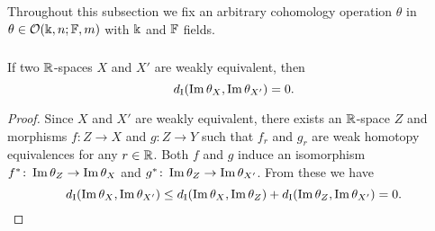 Throughout this subsection we fix an arbitrary cohomology operation $\theta$ in $\theta \in \mathcal{O}(\Bbbk, n; \mathbb{F}, m)$ with $\Bbbk$ and $\mathbb{F}$ fields.



%
%

\subsubsection{}\label{lem:w.h.e. preservance}
\lemma If two $\mathbb{R}$-spaces $X$ and $X'$ are weakly equivalent, then
\[
d_{\mathrm{I}}(\operatorname{Im}\theta_{X},\operatorname{Im}\theta_{X'}) = 0.
\]

\begin{proof}
	Since $X$ and $X'$ are weakly equivalent, there exists an $\mathbb{R}$-space $Z$ and morphisms $f \colon Z \to X$ and $g \colon Z \to Y$ such that $f_r$ and $g_r$ are weak homotopy equivalences for any $r \in \mathbb{R}$.
        Both $f$ and $g$ induce an isomorphism $f^* \colon \operatorname{Im}\theta_{Z} \to \operatorname{Im}\theta_{X}$ and $g^* \colon \operatorname{Im}\theta_{Z} \to \operatorname{Im}\theta_{X'}$. 
	From these we have
	\[
	d_{\mathrm{I}}(\operatorname{Im}\theta_{X},\operatorname{Im}\theta_{X'}) \leq
	d_{\mathrm{I}}(\operatorname{Im}\theta_{X},\operatorname{Im}\theta_{Z}) + d_{\mathrm{I}}(\operatorname{Im}\theta_{Z},\operatorname{Im}\theta_{X'}) =
	0.\qedhere
	\]
\end{proof}

